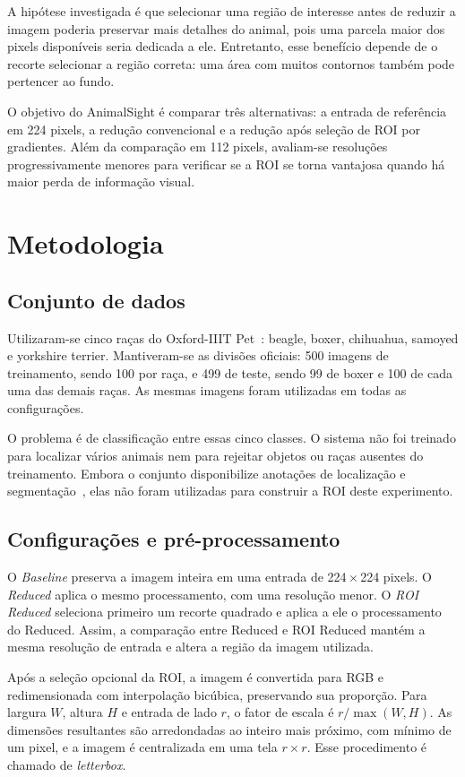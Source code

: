 \documentclass[conference]{IEEEtran}
\begin{document}
A hipótese investigada é que selecionar uma região de interesse antes
de reduzir a imagem poderia preservar mais detalhes do animal, pois
uma parcela maior dos pixels disponíveis seria dedicada a ele.
Entretanto, esse benefício depende de o recorte selecionar a região
correta: uma área com muitos contornos também pode pertencer ao fundo.

O objetivo do AnimalSight é comparar três alternativas: a entrada
de referência em 224 pixels, a redução convencional e a redução após
seleção de ROI por gradientes. Além da comparação em 112 pixels,
avaliam-se resoluções progressivamente menores para verificar se a ROI
se torna vantajosa quando há maior perda de informação visual.

\section{Metodologia}
\subsection{Conjunto de dados}
Utilizaram-se cinco raças do Oxford-IIIT Pet~\cite{pets}: beagle,
boxer, chihuahua, samoyed e yorkshire terrier. Mantiveram-se as divisões
oficiais: 500 imagens de treinamento, sendo 100 por raça, e 499 de
teste, sendo 99 de boxer e 100 de cada uma das demais raças.
As mesmas imagens foram utilizadas em todas as configurações.

O problema é de classificação entre essas cinco classes. O sistema
não foi treinado para localizar vários animais nem para rejeitar
objetos ou raças ausentes do treinamento. Embora o conjunto disponibilize
anotações de localização e segmentação~\cite{pets}, elas não foram
utilizadas para construir a ROI deste experimento.

\subsection{Configurações e pré-processamento}
O \textit{Baseline} preserva a imagem inteira em uma entrada de
224\,$\times$\,224 pixels. O \textit{Reduced} aplica o mesmo processamento,
com uma resolução menor. O \textit{ROI Reduced} seleciona primeiro
um recorte quadrado e aplica a ele o processamento do Reduced.
Assim, a comparação entre Reduced e ROI Reduced mantém a mesma
resolução de entrada e altera a região da imagem utilizada.

Após a seleção opcional da ROI, a imagem é convertida para RGB e
redimensionada com interpolação bicúbica, preservando sua proporção.
Para largura $W$, altura $H$ e entrada de lado $r$, o fator de escala
é $r/\max(W,H)$. As dimensões resultantes são arredondadas ao inteiro
mais próximo, com mínimo de um pixel, e a imagem é centralizada em
uma tela $r\times r$. Esse procedimento é chamado de \textit{letterbox}.
\end{document}
